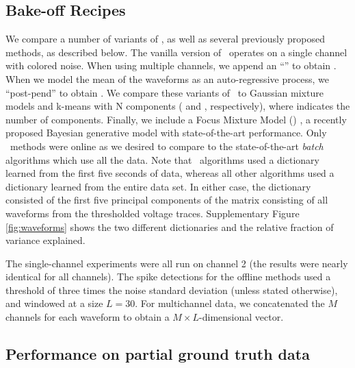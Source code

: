\subsection{Bake-off Recipes}

We compare a number of variants of \smug, as well as several previously proposed methods, as described below.  The vanilla version of \smug\ operates on a single channel with colored noise.  When using multiple channels, we append an ``'' to obtain \smug.  When we model the mean of the waveforms as an auto-regressive process, we ``post-pend'' to obtain \smug{}.  
We compare these variants of \smug\ to Gaussian mixture models and k-means with N components ( and , respectively), where  indicates the number of components.  Finally, we include a Focus Mixture Model () \cite{??}, a recently proposed Bayesian generative model with state-of-the-art performance.  Only \smug\ methods were online as we desired to compare to the state-of-the-art \emph{batch} algorithms which use all the data. 
Note that \smug\ algorithms used a dictionary learned from the first five seconds of data, whereas all other algorithms used a dictionary learned from the entire data set.  In either case, the dictionary consisted of the first five principal components of the matrix consisting of all waveforms from the thresholded voltage traces.  Supplementary Figure \ref{fig:waveforms} shows the two different dictionaries and the relative fraction of variance explained.

% 
% 
The single-channel experiments were all run on channel 2 (the results were nearly identical for all channels).  The spike detections for the offline methods used a threshold of three times the noise standard deviation \cite{Lewicki} (unless stated otherwise), and windowed at a size $L=30$.  For multichannel data, we concatenated the $M$ channels for each waveform to obtain a $M\times L$-dimensional vector.



\subsection{Performance on partial ground truth data}



